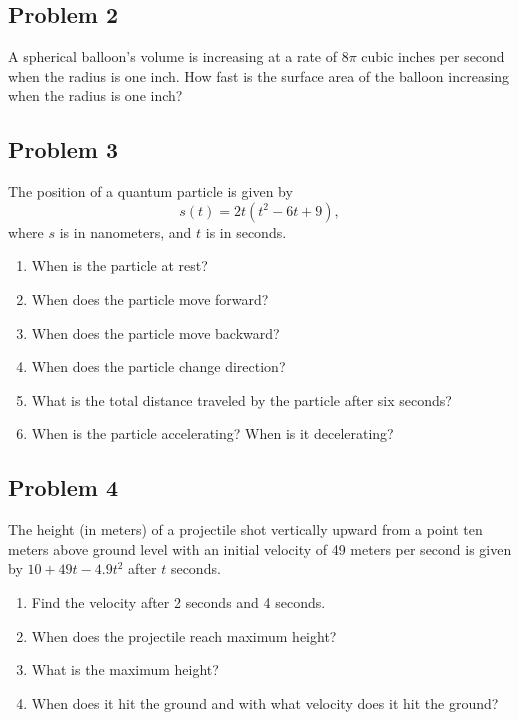 \documentclass[10pt]{book}
\theoremstyle{definition}
\begin{document}
\subsection*{Problem 2} A spherical balloon's volume is increasing at a rate of $\displaystyle 8\pi$ cubic inches per second when the radius is one inch. How fast is the surface area of the balloon increasing when the radius is one inch?
\clearpage
\subsection*{Problem 3} The position of a quantum particle is given by 
\[
s(t)=2t(t^2-6t+9),
\]
where $s$ is in nanometers, and $t$ is in seconds.
\begin{enumerate}[label=(\alph*)]
    \item When is the particle at rest?\vspace{2cm}
    \item When does the particle move forward?\vspace{2cm}
    \item When does the particle move backward?\vspace{2cm}
    \item When does the particle change direction?\vspace{2cm}
    \item What is the total distance traveled by the particle after six seconds?\vspace{3cm}
    \item When is the particle accelerating? When is it decelerating?\vspace{2cm}
\end{enumerate}
\clearpage
\subsection*{Problem 4} The height (in meters) of a projectile shot vertically upward from a point ten meters above ground level with an initial velocity of 49 meters per second is given by $10+49t-4.9t^2$ after $t$ seconds.
\begin{enumerate}[label=(\alph*)]
    \item Find the velocity after 2 seconds and 4 seconds.\vspace{2cm}
    \item When does the projectile reach maximum height?\vspace{2cm}
    \item What is the maximum height?\vspace{2cm}
    \item When does it hit the ground and with what velocity does it hit the ground?\vspace{3cm}
\end{enumerate}
\end{document}
